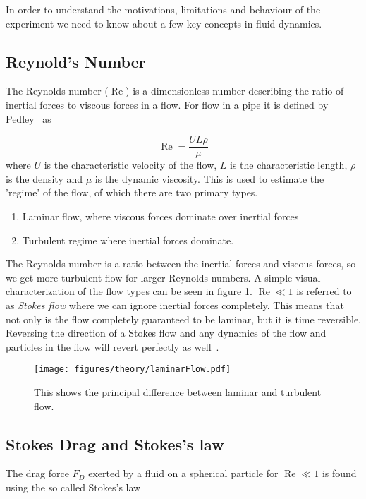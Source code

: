 
In order to understand the motivations, limitations and behaviour of the experiment we need to know about a few key concepts in fluid dynamics.



\subsection{Reynold's Number}
The Reynolds number ($\operatorname{Re}$) is a dimensionless number describing the ratio of inertial forces to viscous forces in a flow. For flow in a pipe it is defined by Pedley~\cite{introfluid} as


\begin{equation}\label{eq:reynolds}
\operatorname{Re} = \frac{U L \rho}{\mu}
\end{equation}
where $U$ is the characteristic velocity of the flow, $L$ is the characteristic length, $\rho$ is the density and $\mu$ is the dynamic viscosity. This is used to estimate the 'regime' of the flow, of which there are two primary types. 
\begin{enumerate}
\item Laminar flow, where viscous forces dominate over inertial forces
\item Turbulent regime where inertial forces dominate.
\end{enumerate}

The Reynolds number is a ratio between the inertial forces and viscous forces, so we get more turbulent flow for larger 
Reynolds numbers. A simple visual characterization of the flow types can be seen in figure \ref{fig:laminar_flow}. 
 $\operatorname{Re}\ll 1$ is referred to as \emph{Stokes flow} where we can ignore inertial forces completely. This 
 means that not only is the flow completely guaranteed to be laminar, but it is time reversible.
Reversing the direction of a Stokes flow and any dynamics of the flow and particles in the flow will revert perfectly as well~\cite{introfluid3}. 

\begin{figure}[H]
\centering
\texttt{[image: figures/theory/laminarFlow.pdf]}
\caption{This shows the principal difference between laminar and turbulent flow.}
\label{fig:laminar_flow}
\end{figure}


\subsection{Stokes Drag and Stokes's law}
The drag force $F_D$ exerted by a fluid on a spherical particle for $\operatorname{Re} \ll 1$ is found using the so called Stokes's law \cite{introfluid2}

